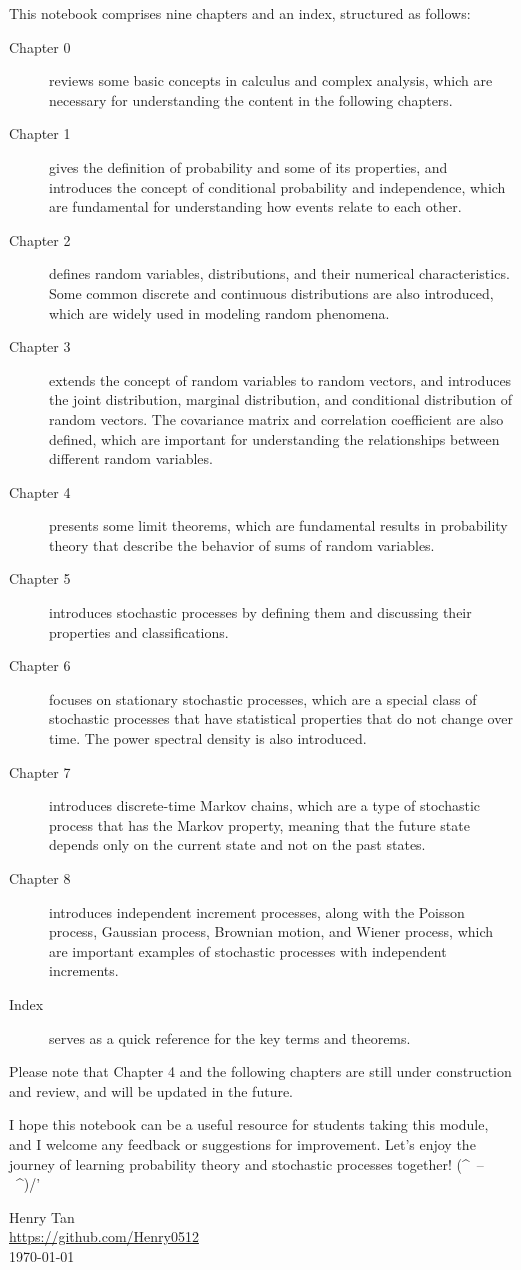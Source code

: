 This notebook comprises nine chapters and an index, structured as follows:
\begin{description}
  \item[Chapter 0] reviews some basic concepts in calculus and complex analysis, which are necessary for understanding the content in the following chapters.
  \item[Chapter 1] gives the definition of probability and some of its properties, and introduces the concept of conditional probability and independence, which are fundamental for understanding how events relate to each other.
  \item[Chapter 2] defines random variables, distributions, and their numerical characteristics. Some common discrete and continuous distributions are also introduced, which are widely used in modeling random phenomena.
  \item[Chapter 3] extends the concept of random variables to random vectors, and introduces the joint distribution, marginal distribution, and conditional distribution of random vectors. The covariance matrix and correlation coefficient are also defined, which are important for understanding the relationships between different random variables.
  \item[Chapter 4] presents some limit theorems, which are fundamental results in probability theory that describe the behavior of sums of random variables.
  \item[Chapter 5] introduces stochastic processes by defining them and discussing their properties and classifications.
  \item[Chapter 6] focuses on stationary stochastic processes, which are a special class of stochastic processes that have statistical properties that do not change over time. The power spectral density is also introduced.
  \item[Chapter 7] introduces discrete-time Markov chains, which are a type of stochastic process that has the Markov property, meaning that the future state depends only on the current state and not on the past states.
  \item[Chapter 8] introduces independent increment processes, along with the Poisson process, Gaussian process, Brownian motion, and Wiener process, which are important examples of stochastic processes with independent increments.
  \item[Index] serves as a quick reference for the key terms and theorems.
\end{description}
Please note that Chapter 4 and the following chapters are still under construction and review, and will be updated in the future.

I hope this notebook can be a useful resource for students taking this module, and I welcome any feedback or suggestions for improvement. Let's enjoy the journey of learning probability theory and stochastic processes together! (\^{}~--~\^{})/'

\vspace{2em}
\begin{flushright}
  Henry Tan\\
  \href{https://github.com/Henry0512}{https://github.com/Henry0512}\\
  \today
\end{flushright}